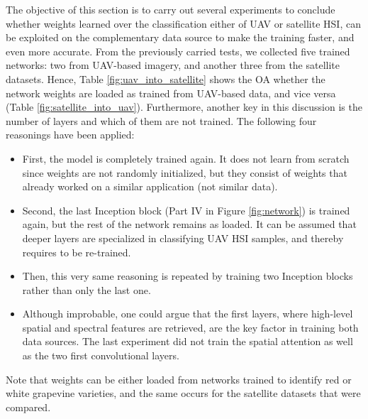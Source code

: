 The objective of this section is to carry out several experiments to conclude whether weights learned over the classification either of UAV or satellite HSI, can be exploited on the complementary data source to make the training faster, and even more accurate. From the previously carried tests, we collected five trained networks: two from UAV-based imagery, and another three from the satellite datasets. Hence, Table \ref{fig:uav_into_satellite} shows the OA whether the network weights are loaded as trained from UAV-based data, and vice versa (Table \ref{fig:satellite_into_uav}). Furthermore, another key in this discussion is the number of layers and which of them are not trained. The following four reasonings have been applied:
\begin{itemize}
    \item First, the model is completely trained again. It does not learn from scratch since weights are not randomly initialized, but they consist of weights that already worked on a similar application (not similar data).
    \item Second, the last Inception block (Part IV in Figure \ref{fig:network}) is trained again, but the rest of the network remains as loaded. It can be assumed that deeper layers are specialized in classifying UAV HSI samples, and thereby requires to be re-trained.
    \item Then, this very same reasoning is repeated by training two Inception blocks rather than only the last one.
    \item Although improbable, one could argue that the first layers, where high-level spatial and spectral features are retrieved, are the key factor in training both data sources. The last experiment did not train the spatial attention as well as the two first convolutional layers.
\end{itemize}

Note that weights can be either loaded from networks trained to identify red or white grapevine varieties, and the same occurs for the satellite datasets that were compared.

